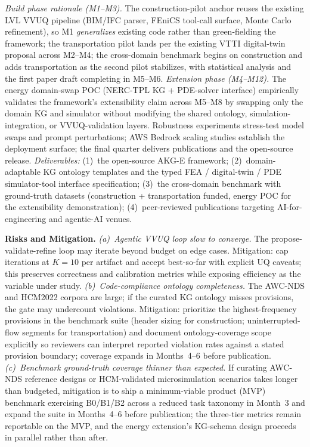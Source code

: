 \documentclass[conference, 10pt]{IEEEtran}
\begin{document}
\textit{Build phase rationale (M1--M3).} The construction-pilot anchor reuses the existing LVL VVUQ pipeline (BIM/IFC parser, FEniCS tool-call surface, Monte Carlo refinement), so M1 \textit{generalizes} existing code rather than green-fielding the framework; the transportation pilot lands per the existing VTTI digital-twin proposal across M2--M4; the cross-domain benchmark begins on construction and adds transportation as the second pilot stabilizes, with statistical analysis and the first paper draft completing in M5--M6.
\textit{Extension phase (M4--M12).} The energy domain-swap POC (NERC-TPL KG + PDE-solver interface) empirically validates the framework's extensibility claim across M5--M8 by swapping only the domain KG and simulator without modifying the shared ontology, simulation-integration, or VVUQ-validation layers. Robustness experiments stress-test model swaps and prompt perturbations; AWS Bedrock scaling studies establish the deployment surface; the final quarter delivers publications and the open-source release.
\textit{Deliverables:} (1)~the open-source AKG-E framework; (2)~domain-adaptable KG ontology templates and the typed FEA / digital-twin / PDE simulator-tool interface specification; (3)~the cross-domain benchmark with ground-truth datasets (construction + transportation funded, energy POC for the extensibility demonstration); (4)~peer-reviewed publications targeting AI-for-engineering and agentic-AI venues.

\textbf{Risks and Mitigation.} \textit{(a)~Agentic VVUQ loop slow to converge.} The propose-validate-refine loop may iterate beyond budget on edge cases. Mitigation: cap iterations at $K=10$ per artifact and accept best-so-far with explicit UQ caveats; this preserves correctness and calibration metrics while exposing efficiency as the variable under study. \textit{(b)~Code-compliance ontology completeness.} The AWC-NDS and HCM2022 corpora are large; if the curated KG ontology misses provisions, the gate may undercount violations. Mitigation: prioritize the highest-frequency provisions in the benchmark suite (header sizing for construction; uninterrupted-flow segments for transportation) and document ontology-coverage scope explicitly so reviewers can interpret reported violation rates against a stated provision boundary; coverage expands in Months~4--6 before publication. \textit{(c)~Benchmark ground-truth coverage thinner than expected.} If curating AWC-NDS reference designs or HCM-validated microsimulation scenarios takes longer than budgeted, mitigation is to ship a minimum-viable product (MVP) benchmark exercising B0/B1/B2 across a reduced task taxonomy in Month~3 and expand the suite in Months~4--6 before publication; the three-tier metrics remain reportable on the MVP, and the energy extension's KG-schema design proceeds in parallel rather than after.
\end{document}
